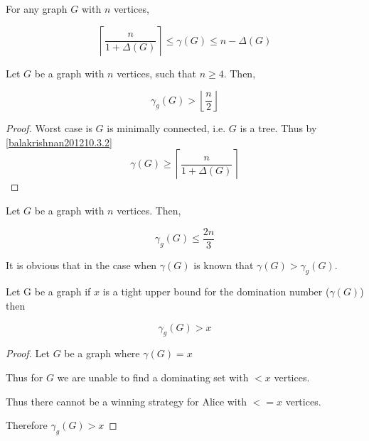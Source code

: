 \begin{theorem} [Balakrishnan 2012 10.3.2] \label{balakrishnan201210.3.2}
    For any graph $G$ with $n$ vertices, 
    
    \[ \left\lceil {\frac{n}{1+\Delta(G)}} \right\rceil \leq \gamma(G) \leq n - \Delta(G)\]    \cite{balakrishnan2012}
    
\end{theorem}

\begin{theorem} \label{minDomSize}
    Let $G$ be a graph with $n$ vertices, such that $n \geq 4$. Then,
    
    \[ \gamma_g(G) > \left \lfloor{\frac{n}{2}}\right \rfloor \]
    
\end{theorem}

\begin{proof}
Worst case is $G$ is minimally connected, i.e. $G$ is a tree. Thus by \ref{balakrishnan201210.3.2} 
\[\gamma(G) \geq \left\lceil {\frac{n}{1+\Delta(G)}} \right\rceil\]       
\end{proof}

\begin{theorem}
    Let $G$ be a graph with $n$ vertices. Then,
    
    \[ \gamma_g(G) \leq \frac{2n}{3}\]
\end{theorem}

    It is obvious that in the case when $\gamma(G)$ is known that $\gamma(G) > \gamma_g(G)$.
\begin{theorem}
    Let G be a graph if $x$ is a tight upper bound for the domination number ($\gamma(G)$) then  
    
    \[ \gamma_g(G) > x\]
    
\end{theorem}

\begin{proof}
    Let $G$ be a graph where $\gamma(G) = x$
 
    Thus for $G$ we are unable to find a dominating set with $ < x$ vertices.
    
    Thus there cannot be a winning strategy for Alice with $<= x$ vertices.
    
    Therefore $\gamma_g(G) > x$
\end{proof}















